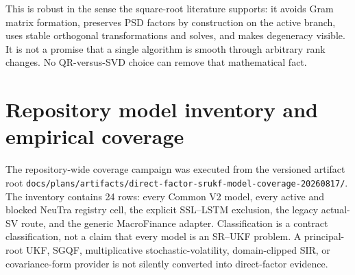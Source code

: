 \documentclass[11pt]{article}
\begin{document}
This is robust in the sense the square-root literature supports: it avoids Gram
matrix formation, preserves PSD factors by construction on the active branch,
uses stable orthogonal transformations and solves, and makes degeneracy visible.
It is not a promise that a single algorithm is smooth through arbitrary rank
changes.  No QR-versus-SVD choice can remove that mathematical fact.

\section{Repository model inventory and empirical coverage}
\label{sec:empirical-coverage}

The repository-wide coverage campaign was executed from the versioned artifact
root \texttt{docs/plans/artifacts/direct-factor-srukf-model-coverage-20260817/}.
The inventory contains 24 rows: every Common V2 model, every active and blocked
NeuTra registry cell, the explicit SSL--LSTM exclusion, the legacy actual-SV
route, and the generic MacroFinance adapter. Classification is a contract
classification, not a claim that every model is an SR--UKF problem. A
principal-root UKF, SGQF, multiplicative stochastic-volatility,
domain-clipped SIR, or covariance-form provider is not silently converted into
direct-factor evidence.
\end{document}

